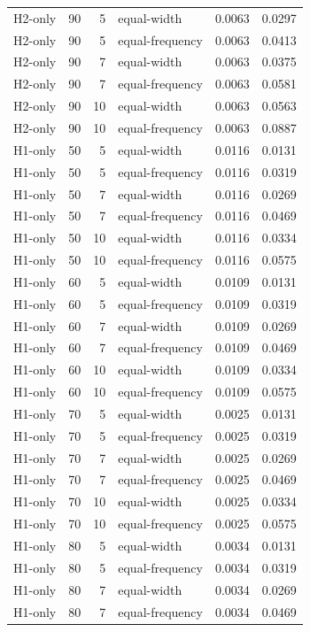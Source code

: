 \begin{tabular}{lrrlrr}
H2-only & 90 & 5 & equal-width & 0.0063 & 0.0297 \\
H2-only & 90 & 5 & equal-frequency & 0.0063 & 0.0413 \\
H2-only & 90 & 7 & equal-width & 0.0063 & 0.0375 \\
H2-only & 90 & 7 & equal-frequency & 0.0063 & 0.0581 \\
H2-only & 90 & 10 & equal-width & 0.0063 & 0.0563 \\
H2-only & 90 & 10 & equal-frequency & 0.0063 & 0.0887 \\
H1-only & 50 & 5 & equal-width & 0.0116 & 0.0131 \\
H1-only & 50 & 5 & equal-frequency & 0.0116 & 0.0319 \\
H1-only & 50 & 7 & equal-width & 0.0116 & 0.0269 \\
H1-only & 50 & 7 & equal-frequency & 0.0116 & 0.0469 \\
H1-only & 50 & 10 & equal-width & 0.0116 & 0.0334 \\
H1-only & 50 & 10 & equal-frequency & 0.0116 & 0.0575 \\
H1-only & 60 & 5 & equal-width & 0.0109 & 0.0131 \\
H1-only & 60 & 5 & equal-frequency & 0.0109 & 0.0319 \\
H1-only & 60 & 7 & equal-width & 0.0109 & 0.0269 \\
H1-only & 60 & 7 & equal-frequency & 0.0109 & 0.0469 \\
H1-only & 60 & 10 & equal-width & 0.0109 & 0.0334 \\
H1-only & 60 & 10 & equal-frequency & 0.0109 & 0.0575 \\
H1-only & 70 & 5 & equal-width & 0.0025 & 0.0131 \\
H1-only & 70 & 5 & equal-frequency & 0.0025 & 0.0319 \\
H1-only & 70 & 7 & equal-width & 0.0025 & 0.0269 \\
H1-only & 70 & 7 & equal-frequency & 0.0025 & 0.0469 \\
H1-only & 70 & 10 & equal-width & 0.0025 & 0.0334 \\
H1-only & 70 & 10 & equal-frequency & 0.0025 & 0.0575 \\
H1-only & 80 & 5 & equal-width & 0.0034 & 0.0131 \\
H1-only & 80 & 5 & equal-frequency & 0.0034 & 0.0319 \\
H1-only & 80 & 7 & equal-width & 0.0034 & 0.0269 \\
H1-only & 80 & 7 & equal-frequency & 0.0034 & 0.0469 \\

\end{tabular}
